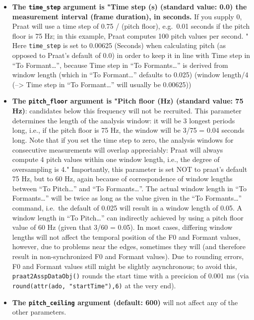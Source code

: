 \documentclass[
]{book}
\providecommand{\tightlist}{%
  \setlength{\itemsep}{0pt}\setlength{\parskip}{0pt}}
\begin{document}
\begin{itemize}
\tightlist
\item
  \textbf{The \texttt{time\_step} argument is "Time step (s) (standard value: 0.0) the measurement interval (frame duration), in seconds.}
  If you supply 0, Praat will use a time step of 0.75 / (pitch floor), e.g.~0.01 seconds if the pitch floor is 75 Hz;
  in this example, Praat computes 100 pitch values per second. "
  Here \texttt{time\_step} is set to 0.00625 (Seconds) when calculating pitch (as opposed to Praat's default of 0.0) in order
  to keep it in line with Time step in ``To Formant\ldots{}'',
  because Time step in ``To Formants\ldots{}'' is derived from
  window length (which in ``To Formant\ldots{}'' defaults to 0.025) (window length/4 (--\textgreater{} Time step in ``To Formant\ldots{}''
  will usually be 0.00625))
\item
  \textbf{The \texttt{pitch\_floor} argument is "Pitch floor (Hz) (standard value: 75 Hz)}:
  candidates below this frequency will not be recruited.
  This parameter determines the length of the analysis window: it will be 3 longest periods long, i.e.,
  if the pitch floor is 75 Hz, the window will be 3/75 = 0.04 seconds long.
  Note that if you set the time step to zero, the analysis windows for consecutive measurements will overlap appreciably:
  Praat will always compute 4 pitch values within one window length, i.e., the degree of oversampling is 4."
  Importantly, this parameter is set NOT to praat's default 75 Hz, but to 60 Hz, again because of correspondence
  of window lengths between ``To Pitch\ldots{}'' and ``To Formants\ldots{}''. The actual window length in ``To Formants\ldots{}'' will be twice as long
  as the value given in the ``To Formants\ldots{}'' command, i.e.~the default of 0.025 will result in a window length of 0.05.
  A window length in ``To Pitch\ldots{}'' can indirectly achieved by using a pitch floor value of 60 Hz (given that 3/60 = 0.05).
  In most cases, differing window lengths will not affect the temporal position of the F0 and Formant values, however, due
  to problems near the edges, sometimes they will (and therefore result in non-synchronized F0 and Formant values).
  Due to rounding errors, F0 and Formant values still might be slightly asynchronous; to avoid this, \texttt{praat2AsspDataObj()}
  rounds the start time with a precicion of 0.001 ms (via \texttt{round(attr(ado,\ "startTime"),6)} at the very end).
\item
  \textbf{The \texttt{pitch\_ceiling} argument (default: 600)} will not affect any of the other parameters.
\end{itemize}
\end{document}
